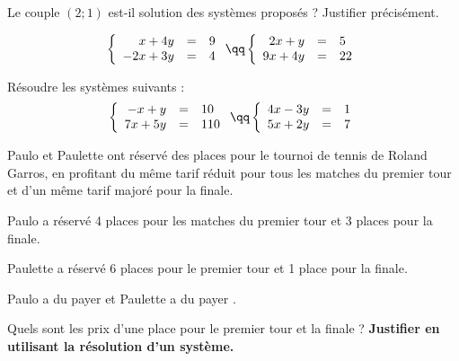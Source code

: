 \documentclass[10pt,french]{book}
\begin{document}
\exo Le couple $(2;1)$ est-il solution des systèmes proposés ? Justifier précisément.

\[\left\{\begin{array}{rcl}
                x+4y&=&9\\
                -2x+3y&=&4\\
            \end{array}
    \right.
\qq
    \left\{\begin{array}{rcl}
            2x+y&=&5\\
            9x+4y&=&22\\
        \end{array}
    \right.\]

\exo Résoudre les systèmes suivants :
\[\left\{\begin{array}{rcl}
                -x + y & = & 10\\
                7x+5y & = & 110\\
            \end{array}
    \right.
\qq
    \left\{\begin{array}{rcl}
            4x-3y&=&1\\
            5x+2y&=&7\\
        \end{array}
    \right.\]

\exo

Paulo et Paulette ont réservé des places pour le tournoi de tennis de Roland Garros, en profitant du même tarif réduit pour tous les matches du premier tour et d'un même tarif majoré pour la finale.\par
Paulo a réservé 4 places pour les matches du premier tour et 3 places pour la finale.\par
Paulette a réservé 6 places pour le premier tour et 1 place pour la finale.\par
Paulo  a du payer  et Paulette a du payer .\par
Quels sont les prix d'une place pour le premier tour et la finale ? \textbf{Justifier en utilisant la résolution d'un système.}
\end{document}
